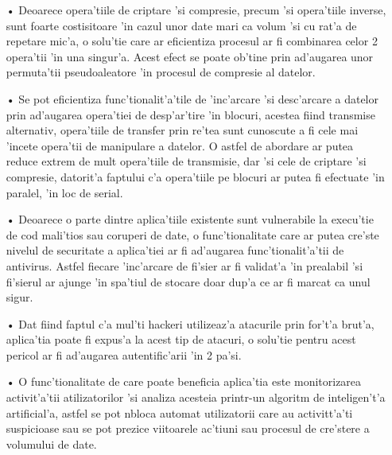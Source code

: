 \documentclass[12pt,a4paper,twoside]{report}
\begin{document}
\begin{itemize}

\item[•] Deoarece opera'tiile de criptare 'si compresie, precum 'si opera'tiile inverse, sunt foarte costisitoare 'in cazul unor date mari ca volum 'si cu rat'a de repetare mic'a, o solu'tie care ar eficientiza procesul ar fi combinarea celor 2 opera'tii 'in una singur'a. Acest efect se poate ob'tine prin ad'augarea unor permuta'tii pseudoaleatore 'in procesul de compresie al datelor\cite{comp_crypto}.

\item[•] Se pot eficientiza func'tionalit'a'tile de 'inc'arcare 'si desc'arcare a datelor prin ad'augarea opera'tiei de desp'ar'tire 'in blocuri, acestea fiind transmise alternativ, opera'tiile de transfer prin re'tea sunt cunoscute a fi cele mai 'incete opera'tii de manipulare a datelor. O astfel de abordare ar putea reduce extrem de mult opera'tiile de transmisie, dar 'si cele de criptare 'si compresie, datorit'a faptului c'a opera'tiile pe blocuri ar putea fi efectuate 'in paralel, 'in loc de serial.

\item[•] Deoarece o parte dintre aplica'tiile existente sunt vulnerabile la execu'tie de cod mali'tios sau coruperi de date, o func'tionalitate care ar putea cre'ste nivelul de securitate a aplica'tiei ar fi ad'augarea func'tionalit'a'tii de antivirus. Astfel  fiecare 'inc'arcare de fi'sier ar fi validat'a 'in prealabil 'si fi'sierul ar ajunge 'in spa'tiul de stocare doar dup'a ce ar fi marcat ca unul sigur.

\item[•] Dat fiind faptul c'a mul'ti hackeri utilizeaz'a atacurile prin for't'a brut'a, aplica'tia poate fi expus'a la acest tip de atacuri, o solu'tie pentru acest pericol ar fi ad'augarea autentific'arii 'in 2 pa'si.

\item[•] O func'tionalitate de care poate beneficia aplica'tia este monitorizarea activit'a'tii atilizatorilor 'si analiza acesteia printr-un algoritm de inteligen't'a artificial'a, astfel se pot nbloca automat utilizatorii care au activitt'a'ti suspicioase sau se pot prezice viitoarele ac'tiuni sau procesul de cre'stere a volumului de date.
\end{itemize}



 


\end{document}
